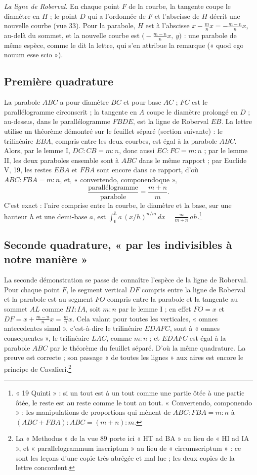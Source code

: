 \documentclass[11pt,a4paper]{article}
\begin{document}
\emph{La ligne de Roberval.} En chaque point $F$ de la courbe, la tangente coupe
le diamètre en $H$ ; le point $D$ qui a l'ordonnée de $F$ et l'abscisse de $H$
décrit une nouvelle courbe (vue 33). Pour la parabole, $H$ est à l'abscisse
$x-\frac{m}{n}x = -\frac{m-n}{n}x$, au-delà du sommet, et la nouvelle courbe est
$\bigl(-\frac{m-n}{n}x,\ y\bigr)$ : une parabole de même espèce, comme le dit la
lettre, qui s'en attribue la remarque (« quod ego nouum esse scio »).

\subsection*{Première quadrature}

La parabole $ABC$ a pour diamètre $BC$ et pour base $AC$ ; $FC$ est le
parallélogramme circonscrit ; la tangente en $A$ coupe le diamètre prolongé en
$D$ ; au-dessus, dans le parallélogramme $FBDE$, est la ligne de Roberval $EB$.
La lettre utilise un théorème démontré sur le feuillet séparé (section suivante) :
le trilinéaire $EBA$, compris entre les deux courbes, est égal à la parabole
$ABC$. Alors, par le lemme I, $DC : CB = m:n$, donc aussi $EC : FC = m:n$ ; par le
lemme II, les deux paraboles ensemble sont à $ABC$ dans le même rapport ; par
Euclide V, 19, les restes $EBA$ et $FBA$ sont encore dans ce rapport, d'où
$ABC : FBA = m:n$, et, « convertendo, componendoque »,
\[
\frac{\text{parallélogramme}}{\text{parabole}} = \frac{m+n}{m}.
\]
C'est exact : l'aire comprise entre la courbe, le diamètre et la base, sur une
hauteur $h$ et une demi-base $a$, est $\int_0^h a\,(x/h)^{n/m}\,dx =
\frac{m}{m+n}\,ah$.\footnote{« 19 Quinti » : si un tout est à un tout comme une
partie ôtée à une partie ôtée, le reste est au reste comme le tout au tout.
« Convertendo, componendo » : les manipulations de proportions qui mènent de
$ABC:FBA=m:n$ à $(ABC+FBA):ABC = (m+n):m$.}

\subsection*{Seconde quadrature, « par les indivisibles à notre manière »}

La seconde démonstration se passe de connaître l'espèce de la ligne de Roberval.
Pour chaque point $F$, le segment vertical $DF$ compris entre la ligne de
Roberval et la parabole est au segment $FO$ compris entre la parabole et la
tangente au sommet $AL$ comme $HI : IA$, soit $m:n$ par le lemme I ; en effet
$FO = x$ et $DF = x+\frac{m-n}{n}x = \frac{m}{n}x$. Cela valant pour toutes les
verticales, « omnes antecedentes simul », c'est-à-dire le trilinéaire $EDAFC$,
sont à « omnes consequentes », le trilinéaire $LAC$, comme $m:n$ ; et $EDAFC$ est égal à la
parabole $ABC$ par le théorème du feuillet séparé. D'où la même quadrature. La
preuve est correcte ; son passage « de toutes les lignes » aux aires est encore le
principe de Cavalieri.\footnote{La « Methodus » de la vue 89 porte ici « HT ad
BA » au lieu de « HI ad IA », et « parallelogrammum inscriptum » au lieu de
« circumscriptum » : ce sont les leçons d'une copie très abrégée et mal lue ; les
deux copies de la lettre concordent.}
\end{document}
